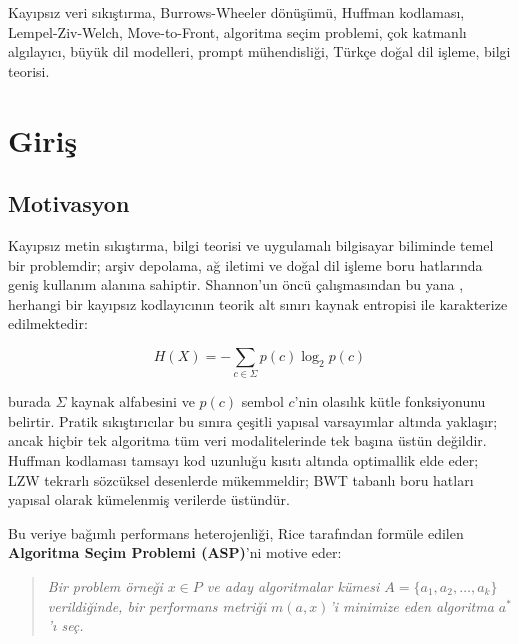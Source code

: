 \documentclass[conference]{IEEEtran}
\begin{document}
\begin{IEEEkeywords}
Kayıpsız veri sıkıştırma, Burrows-Wheeler dönüşümü, Huffman kodlaması, Lempel-Ziv-Welch, Move-to-Front, algoritma seçim problemi, çok katmanlı algılayıcı, büyük dil modelleri, prompt mühendisliği, Türkçe doğal dil işleme, bilgi teorisi.
\end{IEEEkeywords}

\section{Giriş}

\subsection{Motivasyon}

Kayıpsız metin sıkıştırma, bilgi teorisi ve uygulamalı bilgisayar biliminde temel bir problemdir; arşiv depolama, ağ iletimi ve doğal dil işleme boru hatlarında geniş kullanım alanına sahiptir. Shannon'un öncü çalışmasından bu yana \cite{shannon1948}, herhangi bir kayıpsız kodlayıcının teorik alt sınırı kaynak entropisi ile karakterize edilmektedir:

\begin{equation}
H(X) = -\sum_{c \in \Sigma} p(c) \log_2 p(c)
\label{eq:shannon}
\end{equation}

burada \(\Sigma\) kaynak alfabesini ve \(p(c)\) sembol \(c\)'nin olasılık kütle fonksiyonunu belirtir. Pratik sıkıştırıcılar bu sınıra çeşitli yapısal varsayımlar altında yaklaşır; ancak hiçbir tek algoritma tüm veri modalitelerinde tek başına üstün değildir. Huffman kodlaması \cite{huffman1952} tamsayı kod uzunluğu kısıtı altında optimallik elde eder; LZW \cite{welch1984} tekrarlı sözcüksel desenlerde mükemmeldir; BWT tabanlı boru hatları \cite{burrows1994} yapısal olarak kümelenmiş verilerde üstündür.

Bu veriye bağımlı performans heterojenliği, Rice tarafından formüle edilen \cite{rice1976} \textbf{Algoritma Seçim Problemi (ASP)}'ni motive eder:

\begin{quote}
\emph{Bir problem örneği \(x \in P\) ve aday algoritmalar kümesi \(A = \{a_1, a_2, \ldots, a_k\}\) verildiğinde, bir performans metriği \(m(a, x)\)'i minimize eden algoritma \(a^*\)'ı seç.}
\end{quote}
\end{document}
